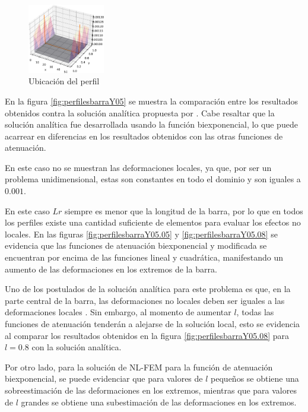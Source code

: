 	\begin{figure}
		\sffamily
		\begin{center}
			\includegraphics[width=0.3\textwidth]{figuras/Barra/defx_bonita_Y0.5.pdf}
		\end{center}
		\caption{Ubicación del perfil}
		\label{fig:defxbonitay05}
	\end{figure}
	En la figura \ref{fig:perfilesbarraY05} se muestra la comparación entre los resultados obtenidos contra la solución analítica propuesta por \textcite{Pisano2003}. Cabe resaltar que la solución analítica fue desarrollada usando la función biexponencial, lo que puede acarrear en diferencias en los resultados obtenidos con las otras funciones de atenuación.


	En este caso no se muestran las deformaciones locales, ya que, por ser un problema unidimensional, estas son constantes en todo el dominio y son iguales a $0.001$. 

	En este caso $Lr$ siempre es menor que la longitud de la barra, por lo que en todos los perfiles existe una cantidad suficiente de elementos para evaluar los efectos no locales. En las figuras \ref{fig:perfilesbarraY05.05} y \ref{fig:perfilesbarraY05.08} se evidencia que las funciones de atenuación biexponencial y modificada se encuentran por encima de las funciones lineal y cuadrática, manifestando un aumento de las deformaciones en los extremos de la barra.

	Uno de los postulados de la solución analítica para este problema es que, en la parte central de la barra, las deformaciones no locales deben ser iguales a las deformaciones locales \parencite{Pisano2003,article}. Sin embargo, al momento de aumentar $l$, todas las funciones de atenuación tenderán a alejarse de la solución local, esto se evidencia al comparar los resultados obtenidos en la figura \ref{fig:perfilesbarraY05.08} para $l=0.8$ con la solución analítica.

	Por otro lado, para la solución de NL-FEM para la función de atenuación biexponencial, se puede evidenciar que para valores de $l$ pequeños se obtiene una sobreestimación de las deformaciones en los extremos, mientras que para valores de $l$ grandes se obtiene una subestimación de las deformaciones en los extremos.
